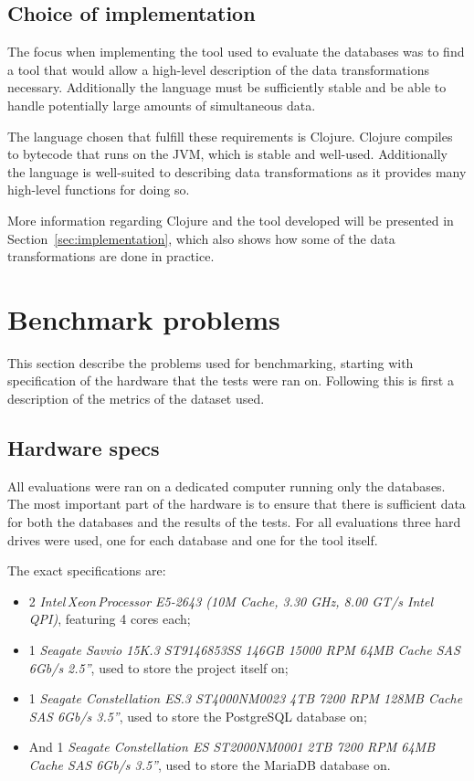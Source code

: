 \subsection{Choice of implementation}\label{sec:implchoice}
The focus when implementing the tool used to evaluate the databases was to find
a tool that would allow a high-level description of the data transformations
necessary. Additionally the language must be sufficiently stable and be able to
handle potentially large amounts of simultaneous data.

The language chosen that fulfill these requirements is Clojure. Clojure compiles
to bytecode that runs on the JVM, which is stable and well-used. Additionally
the language is well-suited to describing data transformations as it provides
many high-level functions for doing so.

More information regarding Clojure and the tool developed will be presented in
Section~\ref{sec:implementation}, which also shows how some of the data
transformations are done in practice.

\section{Benchmark problems}\label{sec:benchmark}
This section describe the problems used for benchmarking, starting with
specification of the hardware that the tests were ran on. Following this is
first a description of the metrics of the dataset used.

\subsection{Hardware specs}
All evaluations were ran on a dedicated computer running only the databases.
The most important part of the hardware is to ensure that there is sufficient
data for both the databases and the results of the tests. For all evaluations
three hard drives were used, one for each database and one for the tool itself.

The exact specifications are:
\begin{itemize}
\item 2 \textit{Intel\,\textregistered Xeon\,\textregistered Processor E5-2643 (10M Cache, 3.30 GHz, 8.00 GT/s Intel\,\textregistered
    QPI)}, featuring 4 cores each;
\item 1 \textit{Seagate Savvio 15K.3 ST9146853SS 146GB 15000 RPM 64MB Cache SAS 6Gb/s
    2.5''}, used to store the project itself on;
\item 1 \textit{Seagate Constellation ES.3 ST4000NM0023 4TB 7200 RPM 128MB Cache SAS
    6Gb/s 3.5''}, used to store the PostgreSQL database on;
\item And 1 \textit{Seagate Constellation ES ST2000NM0001 2TB 7200 RPM 64MB Cache SAS 6Gb/s
    3.5''}, used to store the MariaDB database on.
\end{itemize}

